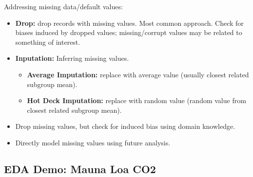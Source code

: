 Addressing missing data/default values:
\begin{itemize}
\item \textbf{Drop:} drop records with missing values. Most common approach. Check for biases induced by dropped values; missing/corrupt values may be related to something of interest.
\item \textbf{Inputation:} Inferring missing values.
\begin{itemize}
    \item \textbf{Average Imputation:} replace with average value (usually closest related subgroup mean).
\item \textbf{Hot Deck Imputation:} replace with random value (random value from closest related subgroup mean).
\end{itemize}
\item Drop missing values, but check for induced bias using domain knowledge.
\item Directly model missing values using future analysis.
\end{itemize}

\subsection{EDA Demo: Mauna Loa CO2}


